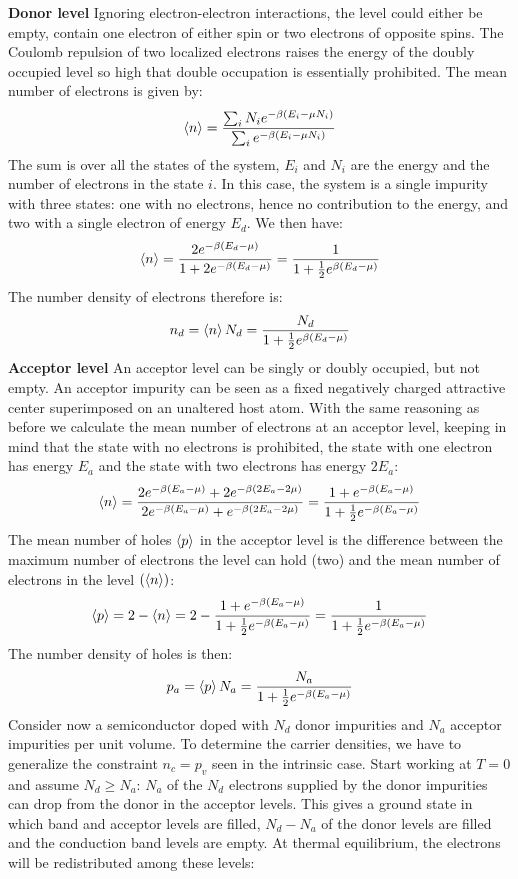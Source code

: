 \documentclass[10.75pt,a4paper,openright,bottom=2cm]{article}
\begin{document}
\textbf{Donor level} Ignoring electron-electron interactions, the level could either be empty, contain one electron of either spin or two electrons of opposite spins. The Coulomb repulsion of two localized electrons raises the energy of the doubly occupied level so high that double occupation is essentially prohibited. The mean number of electrons is given by:
\[
\Braket{n}=\frac{\sum_iN_ie^{-\beta(E_i-\mu N_i)}}{\sum_ie^{-\beta(E_i-\mu N_i)}}
\]
The sum is over all the states of the system, $E_i$ and $N_i$ are the energy and the number of electrons in the state $i$. In this case, the system is a single impurity with three states: one with no electrons, hence no contribution to the energy, and two with a single electron of energy $E_d$. We then have:
\[
\Braket{n}=\frac{2e^{-\beta(E_d-\mu)}}{1+2e^{-\beta(E_d-\mu)}}=\frac{1}{1+\frac{1}{2}e^{\beta(E_d-\mu)}}
\]
The number density of electrons therefore is:
\[
n_d=\Braket{n}N_d=\frac{N_d}{1+\frac{1}{2}e^{\beta(E_d-\mu)}}
\]
\textbf{Acceptor level} An acceptor level can be singly or doubly occupied, but not empty. An acceptor impurity can be seen as a fixed negatively charged attractive center superimposed on an unaltered host atom. With the same reasoning as before we calculate the mean number of electrons at an acceptor level, keeping in mind that the state with no electrons is prohibited, the state with one electron has energy $E_a$ and the state with two electrons has energy $2E_a$:
\[
\Braket{n}=\frac{2e^{-\beta(E_a-\mu)}+2e^{-\beta(2E_a-2\mu)}}{2e^{-\beta(E_a-\mu)}+e^{-\beta(2E_a-2\mu)}}=\frac{1+e^{-\beta(E_a-\mu)}}{1+\frac{1}{2}e^{-\beta(E_a-\mu)}}
\]
The mean number of holes $\Braket{p}$ in the acceptor level is the difference between the maximum number of electrons the level can hold (two) and the mean number of electrons in the level $(\Braket{n})$:
\[
\Braket{p}=2-\Braket{n}=2-\frac{1+e^{-\beta(E_a-\mu)}}{1+\frac{1}{2}e^{-\beta(E_a-\mu)}}=\frac{1}{1+\frac{1}{2}e^{-\beta(E_a-\mu)}}
\]
The number density of holes is then:
\[
p_a=\Braket{p}N_a=\frac{N_a}{1+\frac{1}{2}e^{-\beta(E_a-\mu)}}
\]
Consider now a semiconductor doped with $N_d$ donor impurities and $N_a$ acceptor impurities per unit volume. To determine the carrier densities, we have to generalize the constraint $n_c=p_v$ seen in the intrinsic case. Start working at $T=0$ and assume $N_d\ge N_a$: $N_a$ of the $N_d$ electrons supplied by the donor impurities can drop from the donor in the acceptor levels. This gives a ground state in which band and acceptor levels are filled, $N_d-N_a$ of the donor levels are filled and the conduction band levels are empty. At thermal equilibrium, the electrons will be redistributed among these levels:
\end{document}
